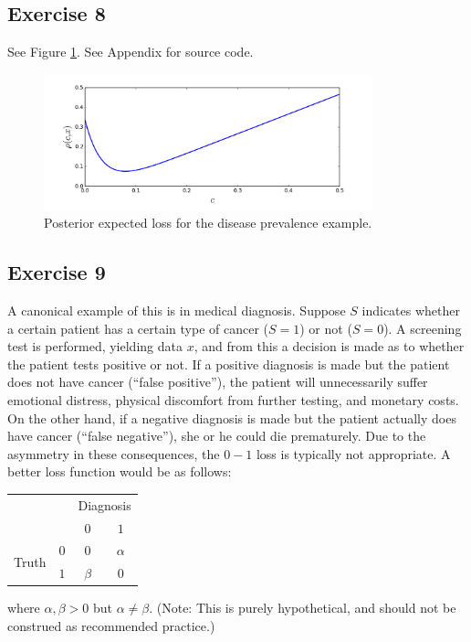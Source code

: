 \documentclass[12pt]{article}
\begin{document}
\subsection*{Exercise 8}

See Figure \ref{figure:rho}. See Appendix for source code.

\begin{figure}
  \begin{center}
    \includegraphics[width=0.85\textwidth]{rho.png}
  \end{center}
  \caption{Posterior expected loss for the disease prevalence example.}
  \label{figure:rho}
\end{figure}

\subsection*{Exercise 9}

A canonical example of this is in medical diagnosis.  Suppose $S$ indicates whether a
certain patient has a certain type of cancer ($S=1$) or not ($S=0$).  A screening test is performed,
yielding data $x$, and from this a decision is made as to whether the patient tests positive or not.  
If a positive diagnosis is made but the patient does not have cancer (``false positive''),
the patient will unnecessarily suffer emotional distress, physical discomfort from further testing,
and monetary costs.
On the other hand, if a negative diagnosis is made but the patient actually does have cancer
(``false negative''), she or he could die prematurely. Due to the asymmetry in these consequences,
the $0-1$ loss is typically not appropriate.  A better loss function would be as follows:
\begin{center}
\begin{tabular}{l r|c|c|}
\multicolumn{2}{r}{} & \multicolumn{2}{c}{Diagnosis} \\
\multicolumn{2}{r}{}
 & \multicolumn{1}{c}{$0$}
 & \multicolumn{1}{c}{$1$} \\
\cline{3-4}
\multirow{2}{*}{Truth} 
   & $0$ & $0$ & $\alpha$ \\
   \cline{3-4}
   & $1$ & $\beta$ & $0$ \\
   \cline{3-4}
\end{tabular}
\end{center}
where $\alpha,\beta>0$ but $\alpha\neq\beta$.  
(Note: This is purely hypothetical, and should not be construed as recommended practice.)
\end{document}
